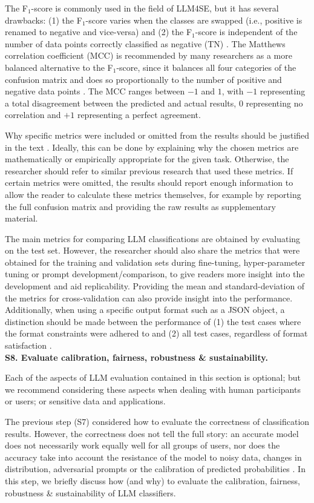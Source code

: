 \documentclass[a4paper]{article}
\newcommand{\infobox}[2]{
	\begin{tcolorbox}[
		skin=widget,
		boxrule=1mm,
		coltitle=black,
		colframe=darkishgray,
		colback=lightergray,
		width=(\linewidth),
		before=\hfill,
		after=\hfill,
		before skip=1pt,
		adjusted title={#1}
		]
		#2
	\end{tcolorbox}
}
\begin{document}
The F$_1$-score is commonly used in the field of LLM4SE, but it has several drawbacks: (1) the F$_1$-score varies when the classes are swapped (i.e., positive is renamed to negative and vice-versa) and (2) the F$_1$-score is independent of the number of data points correctly classified as negative (TN) \cite{powers2015f,Chicco2020}. The Matthews correlation coefficient (MCC) is recommended by many researchers as a more balanced alternative to the F$_1$-score, since it balances all four categories of the confusion matrix and does so proportionally to the number of positive and negative data points \cite{Chicco2020,Foody2023,Yao2020}. The MCC ranges between $-1$ and $1$, with $-1$ representing a total disagreement between the predicted and actual results, $0$ representing no correlation and $+1$ representing a perfect agreement.

Why specific metrics were included or omitted from the results should be justified in the text \cite{Kapoor2024}. Ideally, this can be done by explaining why the chosen metrics are mathematically or empirically appropriate for the given task. Otherwise, the researcher should refer to similar previous research that used these metrics. If certain metrics were omitted, the results should report enough information to allow the reader to calculate these metrics themselves, for example by reporting the full confusion matrix and providing the raw results as supplementary material.

The main metrics for comparing LLM classifications are obtained by evaluating on the test set. However, the researcher should also share the metrics that were obtained for the training and validation sets during fine-tuning, hyper-parameter tuning or prompt development/comparison, to give readers more insight into the development and aid replicability. Providing the mean and standard-deviation of the metrics for cross-validation can also provide insight into the performance. Additionally, when using a specific output format such as a JSON object, a distinction should be made between the performance of (1) the test cases where the format constraints were adhered to and (2) all test cases, regardless of format satisfaction \cite{long2025format}.\\

\textbf{S8. Evaluate calibration, fairness, robustness \& sustainability.}\\
\infobox{Optional}{Each of the aspects of LLM evaluation contained in this section is optional; but we recommend considering these aspects when dealing with human participants or users; or sensitive data and applications.}
The previous step (S7) considered how to evaluate the correctness of classification results. However, the correctness does not tell the full story: an accurate model does not necessarily work equally well for all groups of users, nor does the accuracy take into account the resistance of the model to noisy data, changes in distribution, adversarial prompts or the calibration of predicted probabilities \cite{liu2024,chang2023,guo2017calibration}. In this step, we briefly discuss how (and why) to evaluate the calibration, fairness, robustness \& sustainability of LLM classifiers.
\end{document}
